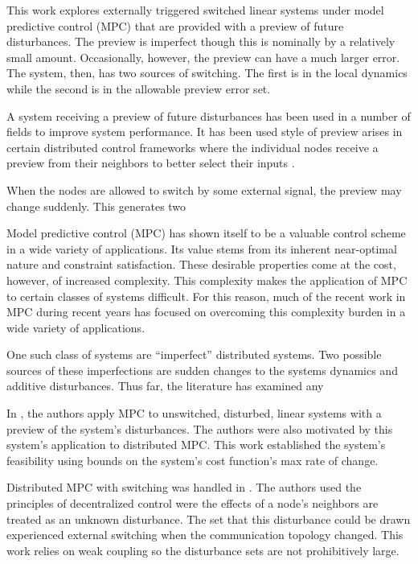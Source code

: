 This work explores externally triggered switched linear systems under model predictive control (MPC) that are provided with a preview of future disturbances. The preview is imperfect though this is nominally by a relatively small amount. Occasionally, however, the preview can have a much larger error. The system, then, has two sources of switching. The first is in the local dynamics while the second is in the allowable preview error set. 

A system receiving a preview of future disturbances has been used in a number of fields to improve system performance. It has been used style of preview arises in certain distributed control frameworks where the individual nodes receive a preview from their neighbors to better select their inputs \cite{Farina2012}.

When the nodes are allowed to switch by some external signal, the preview may change suddenly. This generates two 

Model predictive control (MPC) has shown itself to be a valuable control scheme in a wide variety of applications. Its value stems from its inherent near-optimal nature and constraint satisfaction. These desirable properties come at the cost, however, of increased complexity. This complexity makes the application of MPC to certain classes of systems difficult. For this reason, much of the recent work in MPC during recent years has focused on overcoming this complexity burden in a wide variety of applications. 

One such class of systems are ``imperfect'' distributed systems. Two possible sources of these imperfections are sudden changes to the systems dynamics and additive disturbances. Thus far, the literature has examined any 

In \cite{Monasterios2019}, the authors apply MPC to unswitched, disturbed, linear systems with a preview of the system's disturbances. The authors were also motivated by this system's application to distributed MPC. This work established the system's feasibility using bounds on the system's cost function's max rate of change. 

Distributed MPC with switching was handled in \cite{Ahandani2020}. The authors used the principles of decentralized control were the effects of a node's neighbors are treated as an unknown disturbance. The set that this disturbance could be drawn experienced external switching when the communication topology changed. This work relies on weak coupling so the disturbance sets are not prohibitively large.